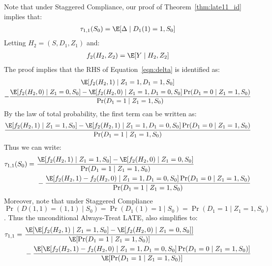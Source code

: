 Note that under Staggered Compliance, our proof of Theorem~\ref{thm:late11_id} implies that:
\begin{align}\label{eqn:delta}
    \tau_{1,1}(S_0) = \E[\Delta \mid D_1(1)=1, S_0]
\end{align}
Letting $H_2=(S, D_1, Z_1)$ and:
\begin{align*}
    f_2(H_2, Z_2) = \E[Y\mid H_2, Z_2]
\end{align*}
The proof implies that the RHS of Equation~\eqref{eqn:delta} is identified as:
\begin{multline*}
    \E[f_2(H_2, 1)\mid Z_1=1, D_1=1, S_0] \\
    - \frac{\E[f_2(H_2, 0) \mid Z_1=0, S_0] - \E[f_2(H_2, 0)\mid Z_1=1, D_1=0, S_0]\Pr(D_1=0\mid Z_1=1, S_0)}{\Pr(D_1=1\mid Z_1=1, S_0)}
\end{multline*}
By the law of total probability, the first term can be written as:
\begin{align*}
    \frac{\E[f_2(H_2, 1)\mid Z_1=1, S_0] - \E[f_2(H_2, 1)\mid Z_1=1, D_1=0, S_0]\Pr(D_1=0\mid Z_1=1, S_0)}{\Pr(D_1=1\mid Z_1=1, S_0)}
\end{align*}
Thus we can write:
\begin{align*}
\tau_{1,1}(S_0) =~& \frac{\E[f_2(H_2, 1)\mid Z_1=1, S_0]-\E[f_2(H_2, 0)\mid Z_1=0, S_0]}{\Pr(D_1=1\mid Z_1=1, S_0)} \\
~& - \frac{\E[f_2(H_2, 1)-f_2(H_2,0)\mid Z_1=1, D_1=0, S_0]\Pr(D_1=0\mid Z_1=1, S_0)}{\Pr(D_1=1\mid Z_1=1, S_0)}
\end{align*}
Moreover, note that under Staggered Compliance $\Pr(D(1,1)=(1,1)\mid S_0)=\Pr(D_1(1)=1\mid S_0)=\Pr(D_1=1\mid Z_1=1, S_0)$. Thus the unconditional Always-Treat LATE, also simplifies to:
\begin{align*}
    \tau_{1,1} =~& \frac{\E[\E[f_2(H_2, 1)\mid Z_1=1, S_0]-\E[f_2(H_2, 0)\mid Z_1=0, S_0]]}{\E[\Pr(D_1=1\mid Z_1=1, S_0)]} \\
~& - \frac{\E[\E[f_2(H_2, 1)-f_2(H_2,0)\mid Z_1=1, D_1=0, S_0]\Pr(D_1=0\mid Z_1=1, S_0)]}{\E[\Pr(D_1=1\mid Z_1=1, S_0)]}
\end{align*}





